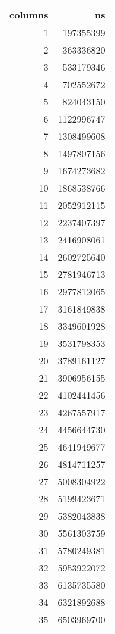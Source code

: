 \begin{figure}[H]
    \centering
    \footnotesize
    \begin{tabular}{r r}
        \toprule
        \textbf{columns} & \textbf{ns} \\
        \midrule
        1 & 197355399 \\
        2 & 363336820 \\
        3 & 533179346 \\
        4 & 702552672 \\
        5 & 824043150 \\
        6 & 1122996747 \\
        7 & 1308499608 \\
        8 & 1497807156 \\
        9 & 1674273682 \\
        10 & 1868538766 \\
        11 & 2052912115 \\
        12 & 2237407397 \\
        13 & 2416908061 \\
        14 & 2602725640 \\
        15 & 2781946713 \\
        16 & 2977812065 \\
        17 & 3161849838 \\
        18 & 3349601928 \\
        19 & 3531798353 \\
        20 & 3789161127 \\
        21 & 3906956155 \\
        22 & 4102441456 \\
        23 & 4267557917 \\
        24 & 4456644730 \\
        25 & 4641949677 \\
        26 & 4814711257 \\
        27 & 5008304922 \\
        28 & 5199423671 \\
        29 & 5382043838 \\
        30 & 5561303759 \\
        31 & 5780249381 \\
        32 & 5953922072 \\
        33 & 6135735580 \\
        34 & 6321892688 \\
        35 & 6503969700 \\

\end{tabular}
\end{figure}
